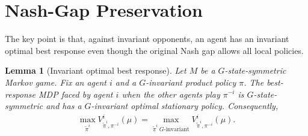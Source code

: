 \documentclass{article}
\theoremstyle{plain}
\newtheorem{lemma}[theorem]{Lemma}
\theoremstyle{definition}
\theoremstyle{remark}
\begin{document}
\section{Nash-Gap Preservation}
\label{app:proof-nash-gap-preservation}

The key point is that, against invariant opponents, an agent has an invariant
optimal best response even though the original Nash gap allows all local policies.

\begin{lemma}[Invariant optimal best response]
\label{lemma:br-mdp-symmetric}
Let $M$ be a $G$-state-symmetric Markov game. Fix an agent $i$ and a
$G$-invariant product policy $\pi$. The best-response MDP faced by agent $i$
when the other agents play $\pi^{-i}$ is $G$-state-symmetric and has a
$G$-invariant optimal stationary policy. Consequently,
\begin{align}
  \max_{\widetilde\pi^i}
  V^i_{\widetilde\pi^i,\pi^{-i}}(\mu)
  =
  \max_{\widetilde\pi^i\ G\text{-invariant}}
  V^i_{\widetilde\pi^i,\pi^{-i}}(\mu).
  \label{eq:br-invariant-suffices}
\end{align}
\end{lemma}
\end{document}
